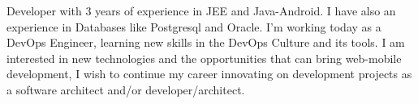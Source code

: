 %
%
%
\par{
Developer with 3 years of experience in JEE and Java-Android. I have also an experience in Databases like Postgresql and Oracle. I'm working today as a DevOps Engineer, learning new skills in the DevOps Culture and its tools. I am interested in new technologies and the opportunities that can bring web-mobile development, I wish to continue my career innovating on development projects as a software architect and/or developer/architect.
}
